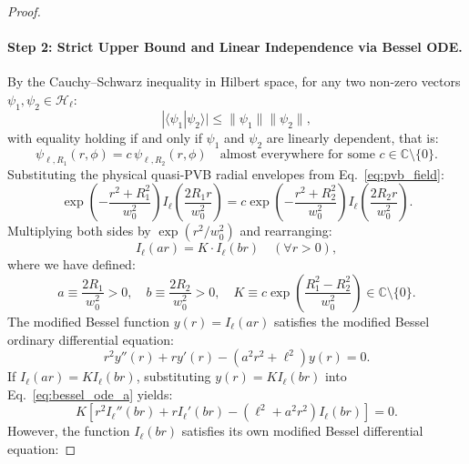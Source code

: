\documentclass[11pt,a4paper]{article}
\begin{document}
\begin{proof}
\paragraph{Step 2: Strict Upper Bound and Linear Independence via Bessel ODE.}
By the Cauchy--Schwarz inequality in Hilbert space, for any two non-zero vectors $\psi_1, \psi_2 \in \mathcal{H}_\ell$:
\begin{equation}
|\langle \psi_1 | \psi_2 \rangle| \le \|\psi_1\| \|\psi_2\|,
\label{eq:cauchy_schwarz}
\end{equation}
with equality holding if and only if $\psi_1$ and $\psi_2$ are linearly dependent, that is:
\begin{equation}
\psi_{\ell, R_1}(r, \phi) = c \, \psi_{\ell, R_2}(r, \phi) \quad \text{almost everywhere for some } c \in \mathbb{C} \setminus \{0\}.
\label{eq:linear_dependence_hypothesis}
\end{equation}
Substituting the physical quasi-PVB radial envelopes from Eq.~\eqref{eq:pvb_field}:
\begin{equation}
\exp\left( - \frac{r^2 + R_1^2}{w_0^2} \right) I_\ell\left( \frac{2 R_1 r}{w_0^2} \right) = c \exp\left( - \frac{r^2 + R_2^2}{w_0^2} \right) I_\ell\left( \frac{2 R_2 r}{w_0^2} \right).
\label{eq:linear_dependence_step1}
\end{equation}
Multiplying both sides by $\exp(r^2 / w_0^2)$ and rearranging:
\begin{equation}
I_\ell(a r) = K \cdot I_\ell(b r) \quad (\forall r > 0),
\label{eq:linear_dependence_step2}
\end{equation}
where we have defined:
\begin{equation}
a \equiv \frac{2 R_1}{w_0^2} > 0, \quad b \equiv \frac{2 R_2}{w_0^2} > 0, \quad K \equiv c \exp\left( \frac{R_1^2 - R_2^2}{w_0^2} \right) \in \mathbb{C} \setminus \{0\}.
\label{eq:ode_constants}
\end{equation}
The modified Bessel function $y(r) = I_\ell(a r)$ satisfies the modified Bessel ordinary differential equation:
\begin{equation}
r^2 y''(r) + r y'(r) - (a^2 r^2 + \ell^2) y(r) = 0.
\label{eq:bessel_ode_a}
\end{equation}
If $I_\ell(a r) = K I_\ell(b r)$, substituting $y(r) = K I_\ell(b r)$ into Eq.~\eqref{eq:bessel_ode_a} yields:
\begin{equation}
K \left[ r^2 I_\ell''(b r) + r I_\ell'(b r) - (\ell^2 + a^2 r^2) I_\ell(b r) \right] = 0.
\label{eq:bessel_ode_substitution}
\end{equation}
However, the function $I_\ell(b r)$ satisfies its own modified Bessel differential equation:

\end{proof}
\end{document}
